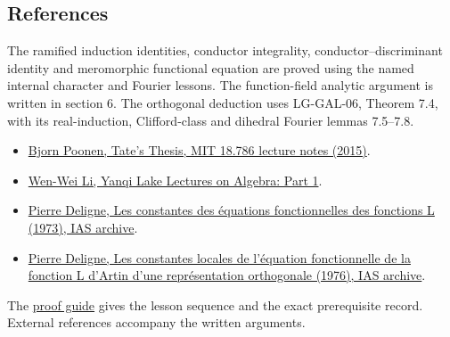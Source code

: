 \documentclass[11pt,a4paper]{article}
\newcommand{\tightlist}{\setlength{\itemsep}{0pt}\setlength{\parskip}{0pt}}
\begin{document}
\subsection{References}\label{references}

The ramified induction identities, conductor integrality,
conductor--discriminant identity and meromorphic functional equation are
proved using the named internal character and Fourier lessons. The
function-field analytic argument is written in section 6. The orthogonal deduction uses LG-GAL-06, Theorem 7.4, with its real-induction, Clifford-class and dihedral Fourier lemmas 7.5–7.8.

\begin{itemize}
\tightlist
\item
  \href{https://math.mit.edu/~poonen/786/notes.pdf}{Bjorn Poonen, Tate's
  Thesis, MIT 18.786 lecture notes (2015)}.
\item
  \href{https://www.wwli.asia/downloads/YAlg1.pdf}{Wen-Wei Li, Yanqi
  Lake Lectures on Algebra: Part 1}.
\item
  \href{https://publications.ias.edu/sites/default/files/Number20.pdf}{Pierre
  Deligne, Les constantes des équations fonctionnelles des fonctions L
  (1973), IAS archive}.
\item
  \href{https://publications.ias.edu/sites/default/files/Number26.pdf}{Pierre
  Deligne, Les constantes locales de l'équation fonctionnelle de la
  fonction L d'Artin d'une représentation orthogonale (1976), IAS
  archive}.
\end{itemize}

The \href{../free-proofs.html}{proof guide} gives the lesson sequence
and the exact prerequisite record. External references accompany the
written arguments.
\end{document}
